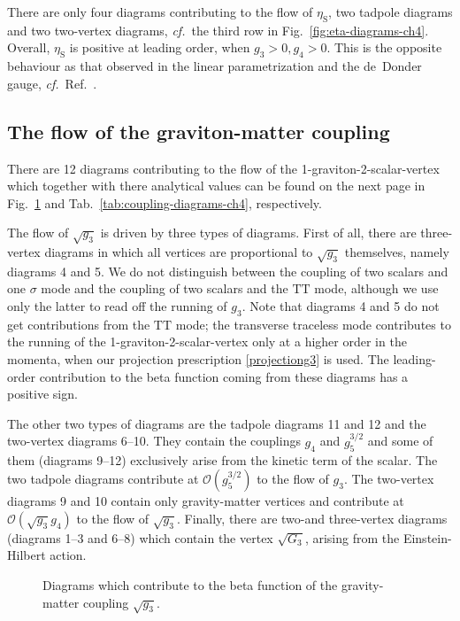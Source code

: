 \documentclass[11pt]{book}
\newcommand\etaS{ \eta_{\scriptscriptstyle{\mathrm{S}}} }
\newcommand\cf{\textit{cf.}\ }
\numberwithin{equation}{chapter}
\begin{document}
There are only four diagrams contributing to the flow of $\etaS$, two tadpole diagrams and two two-vertex diagrams,
\cf the third row in Fig.~\ref{fig:eta-diagrams-ch4}.
Overall, $\etaS$ is positive at leading order, when $g_3>0, g_4>0$.
This is the opposite behaviour as that observed in the linear parametrization
and the de~Donder gauge, \cf Ref.~\cite{Dona:2013qba}.


\subsection{The flow of the graviton-matter coupling}

There are 12 diagrams contributing to the
flow of the 1-graviton-2-scalar-vertex
which together with there analytical values can be found on
the next page
in Fig.~\ref{fig:coupling-diagrams-ch4} and Tab.~\ref{tab:coupling-diagrams-ch4},
respectively.


The flow of $\sqrt{g_3}$ is driven by three types of diagrams.
First of all, there are three-vertex diagrams in which all
vertices are proportional to $\sqrt{g_3}$ themselves,
namely diagrams 4 and 5.
We do not distinguish between the coupling of two
scalars and one $\sigma$ mode and the coupling of two scalars and
the $\mathrm{TT}$ mode,
although we use only the latter to read off the running of $g_3$.
Note that diagrams 4 and 5 do not get contributions from the $\mathrm{TT}$ mode;
the transverse traceless mode contributes to the running of the
1-graviton-2-scalar-vertex only at a higher order in the momenta,
when our projection prescription \eqref{projectiong3} is used.
The leading-order contribution to the beta function coming from
these diagrams has a positive sign.

The other two types of diagrams are the tadpole diagrams 11 and 12
and the two-vertex diagrams 6--10.
They contain the couplings $g_4$ and $g_5^{3/2}$ and
some of them (diagrams 9--12) exclusively arise from the kinetic term of the scalar.
The two tadpole diagrams contribute at $\mathcal{O}(g_5^{3/2})$ to the flow of $g_3$.
The two-vertex diagrams 9 and 10 contain only gravity-matter vertices and contribute
at $\mathcal{O}(\sqrt{g_3} g_4)$ to the flow of $\sqrt{g_3}$.
Finally, there are two-and three-vertex diagrams (diagrams 1--3 and 6--8)
which contain the vertex $\sqrt{G_3}$, arising from the Einstein-Hilbert action.

\begin{figure}[p]
  \begin{center}
    
  \end{center}
  \caption{
    Diagrams which contribute to the beta function of the gravity-matter coupling
    $\sqrt{g_3}$.
  }
  \label{fig:coupling-diagrams-ch4}
\end{figure}
\end{document}
